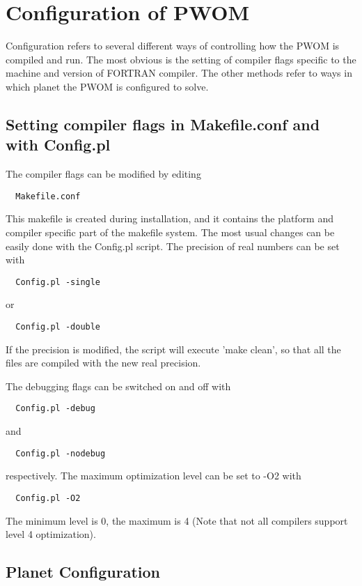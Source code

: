 \section{Configuration of PWOM}

Configuration refers to several different ways of controlling how the 
PWOM is compiled and run.  The most obvious is the setting of
compiler flags specific to the machine and version of FORTRAN
compiler.  The other methods refer to ways in which planet the PWOM 
is configured to solve.

\subsection{Setting compiler flags in Makefile.conf and with Config.pl}

The compiler flags can be modified by editing
\begin{verbatim}
  Makefile.conf
\end{verbatim}
This makefile is created during installation, and it contains the
platform and compiler specific part of the makefile system.
The most usual changes can be easily done with the Config.pl script.
The precision of real numbers can be set with
\begin{verbatim}
  Config.pl -single
\end{verbatim}
or 
\begin{verbatim}
  Config.pl -double
\end{verbatim}
If the precision is modified, the script will execute 'make clean',
so that all the files are compiled with the new real precision.

The debugging flags can be switched on and off with
\begin{verbatim}
  Config.pl -debug
\end{verbatim}
and
\begin{verbatim}
  Config.pl -nodebug
\end{verbatim}
respectively. The maximum optimization level can be set to -O2 with
\begin{verbatim}
  Config.pl -O2
\end{verbatim}
The minimum level is 0, the maximum is 4 (Note that not all compilers support
level 4 optimization).

\subsection{Planet Configuration}

